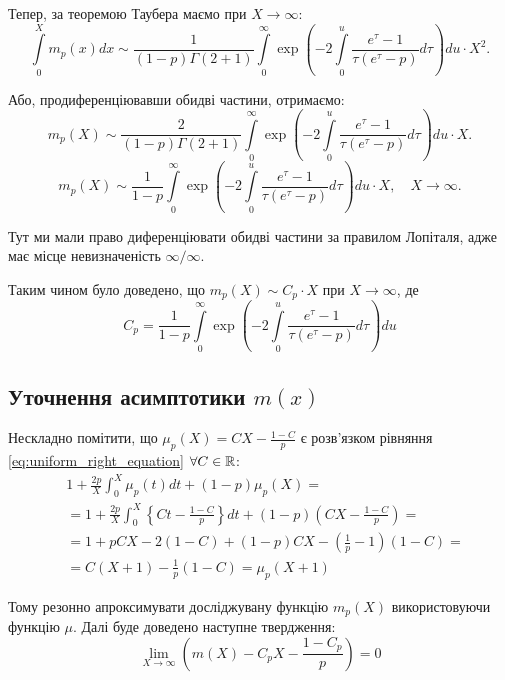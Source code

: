 Тепер, за теоремою Таубера маємо при $X \rightarrow \infty$:
\begin{equation}
	\int\limits_0^X m_p(x) dx \sim \frac{1}{(1-p)\Gamma(2 + 1)} \int\limits_0^\infty \exp\left( -2\int\limits_0^u \frac{e^{\tau} - 1}{\tau(e^\tau - p)} d\tau  \right) du \cdot X^2.
\end{equation}

Або, продиференціювавши обидві частини,  отримаємо:
\begin{equation}
	m_p(X) \sim \frac{2}{(1- p) \Gamma(2 + 1)} \int\limits_0^\infty \exp\left( -2\int\limits_0^u \frac{e^{\tau} - 1}{\tau(e^\tau - p)} d\tau  \right) du \cdot X.
\end{equation}
\begin{equation}
	\label{eq:uniform_right_final}
	m_p(X) \sim \frac{1}{1-p} \int\limits_0^\infty \exp\left( -2\int\limits_0^u \frac{e^{\tau} - 1}{\tau(e^\tau - p)} d\tau  \right) du \cdot X, \quad X \rightarrow \infty.
\end{equation}

Тут ми мали право диференціювати обидві частини за правилом Лопіталя, адже має місце невизначеність $\infty / \infty$.

Таким чином було доведено, що $m_{p}(X) \sim C_{p} \cdot X$ при $X \rightarrow \infty$, де
\begin{equation}
C_{p} = \frac{1}{1-p} \int\limits_0^\infty \exp\left( -2\int\limits_0^u \frac{e^{\tau} - 1}{\tau(e^\tau - p)} d\tau  \right) du
\end{equation}

\subsection{Уточнення асимптотики $m(x)$}

Нескладно помітити, що $\mu_{p}(X) = C X - \frac{1-C}{p}$ є розв'язком рівняння \eqref{eq:uniform_right_equation} $\forall C \in \mathbb{R}$:
\begin{align*}
&1 + \frac{2 p}{X} \int_{0}^{X} \mu_{p}(t) dt + (1 - p)\mu_{p}(X) = \\
&=1 + \frac{2 p}{X} \int_{0}^{X} \left\{C t - \frac{1 - C}{p} \right\} dt + (1 - p) \left( C X - \frac{1 - C}{p}\right) = \\
&=1 + p C X - 2(1 - C) + (1 - p) C X - (\frac{1}{p} - 1)(1 - C) = \\
&= C(X + 1) - \frac{1}{p}(1-C) = \mu_{p}(X+1)
\end{align*}

Тому резонно апроксимувати досліджувану функцію $m_{p}(X)$ використовуючи функцію $\mu$. Далі буде доведено наступне твердження:
\begin{equation}
\lim\limits_{X \rightarrow \infty} \left( m(X) - C_{p} X - \frac{1 - C_{p}}{p} \right) = 0
\end{equation}

